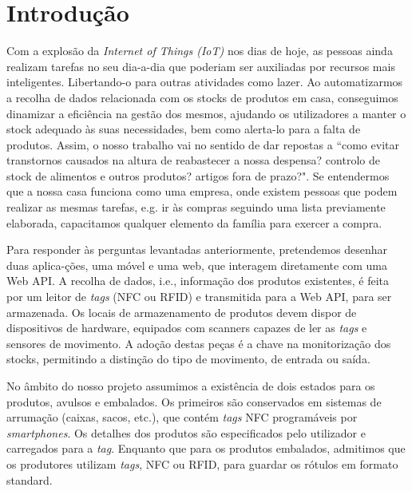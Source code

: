%
%
\section*{Introdução} \label{Introducao}

Com a explosão da \textit{Internet of Things (IoT)} nos dias de hoje, as pessoas ainda realizam tarefas no seu dia-a-dia que poderiam ser auxiliadas por recursos mais inteligentes. Libertando-o para outras atividades como lazer. Ao automatizarmos a recolha de dados relacionada com os stocks de produtos em casa, conseguimos dinamizar a eficiência na gestão dos mesmos, ajudando os utilizadores a manter o stock adequado às suas necessidades, bem como alerta-lo para a falta de produtos. Assim, o nosso trabalho vai no sentido de dar repostas a ``como evitar transtornos causados na altura de reabastecer a nossa despensa? controlo de stock de alimentos e outros produtos? artigos fora de prazo?". Se entendermos que a nossa casa funciona como uma empresa, onde existem pessoas que podem realizar as mesmas tarefas, e.g. ir às compras seguindo uma lista previamente elaborada, capacitamos qualquer elemento da família para exercer a compra.

Para responder às perguntas levantadas anteriormente, pretendemos desenhar duas aplica-ções, uma móvel e uma web, que interagem diretamente com uma Web API. A recolha de dados, i.e., informação dos produtos existentes, é feita por um leitor de {\itshape tags} (NFC ou RFID) e transmitida para a Web API, para ser armazenada. Os locais de armazenamento de produtos devem dispor de dispositivos de hardware, equipados com scanners capazes de ler as {\itshape tags} e sensores de movimento. A adoção destas peças é a chave na monitorização dos stocks, permitindo a distinção do tipo de movimento, de entrada ou saída.

No âmbito do nosso projeto assumimos a existência de dois estados para os produtos, avulsos e embalados. Os primeiros são conservados em sistemas de arrumação (caixas, sacos, etc.), que contém {\itshape tags} NFC programáveis por {\itshape smartphones}. Os detalhes dos produtos são especificados pelo utilizador e carregados para a {\itshape tag}. Enquanto que para os produtos embalados, admitimos que os produtores utilizam {\itshape tags}, NFC ou RFID, para guardar os rótulos em formato standard.


\vspace{-1mm}
\hspace{2mm}

